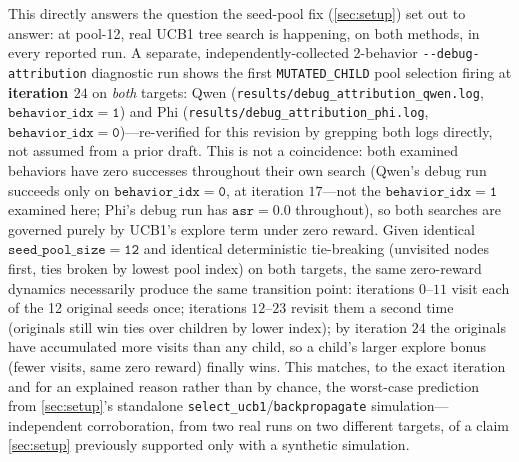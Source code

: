 \documentclass[11pt,letterpaper]{article}
\begin{document}
This directly answers the question the seed-pool fix (\cref{sec:setup}) set out to answer: at
pool-12, real UCB1 tree search is happening, on both methods, in every reported run. A separate,
independently-collected 2-behavior \texttt{-{}-debug-attribution} diagnostic run shows the first
\texttt{MUTATED\_CHILD} pool selection firing at \textbf{iteration $24$} on \textit{both} targets:
Qwen (\texttt{results/debug\_attribution\_qwen.log}, $\mathtt{behavior\_idx=1}$) and Phi
(\texttt{results/debug\_attribution\_phi.log}, $\mathtt{behavior\_idx=0}$)---re-verified for this
revision by grepping both logs directly, not assumed from a prior draft. This is not a
coincidence: both examined behaviors have zero successes throughout their own search (Qwen's
debug run succeeds only on $\mathtt{behavior\_idx=0}$, at iteration $17$---not the
$\mathtt{behavior\_idx=1}$ examined here; Phi's debug run has $\mathtt{asr=0.0}$ throughout), so
both searches are governed purely by UCB1's explore term under zero reward. Given identical
$\mathtt{seed\_pool\_size=12}$ and identical deterministic tie-breaking (unvisited nodes first,
ties broken by lowest pool index) on both targets, the same zero-reward dynamics necessarily
produce the same transition point: iterations $0$--$11$ visit each of the 12 original seeds
once; iterations $12$--$23$ revisit them a second time (originals still win ties over children
by lower index); by iteration $24$ the originals have accumulated more visits than any child, so
a child's larger explore bonus (fewer visits, same zero reward) finally wins. This matches, to
the exact iteration and for an explained reason rather than by chance, the worst-case prediction
from \cref{sec:setup}'s standalone \texttt{select\_ucb1}/\texttt{backpropagate} simulation---independent
corroboration, from two real runs on two different targets, of a claim \cref{sec:setup}
previously supported only with a synthetic simulation.
\end{document}
